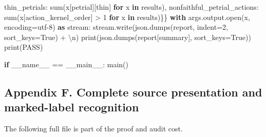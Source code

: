 \documentclass[
  10pt,
  letterpaper,
]{article}
\newenvironment{Shaded}{}{}
\newcommand{\BuiltInTok}[1]{\textcolor[rgb]{0.00,0.50,0.00}{#1}}
\newcommand{\CharTok}[1]{\textcolor[rgb]{0.25,0.44,0.63}{#1}}
\newcommand{\ControlFlowTok}[1]{\textcolor[rgb]{0.00,0.44,0.13}{\textbf{#1}}}
\newcommand{\DecValTok}[1]{\textcolor[rgb]{0.25,0.63,0.44}{#1}}
\newcommand{\ImportTok}[1]{\textcolor[rgb]{0.00,0.50,0.00}{\textbf{#1}}}
\newcommand{\KeywordTok}[1]{\textcolor[rgb]{0.00,0.44,0.13}{\textbf{#1}}}
\newcommand{\NormalTok}[1]{#1}
\newcommand{\OperatorTok}[1]{\textcolor[rgb]{0.40,0.40,0.40}{#1}}
\newcommand{\StringTok}[1]{\textcolor[rgb]{0.25,0.44,0.63}{#1}}
\newcommand{\VariableTok}[1]{\textcolor[rgb]{0.10,0.09,0.49}{#1}}
\begin{document}
\begin{Shaded}
\begin{Highlighting}[]
                 \StringTok{\textquotesingle{}thin\_petrials\textquotesingle{}}\NormalTok{: }\BuiltInTok{sum}\NormalTok{(x[}\StringTok{\textquotesingle{}petrial\textquotesingle{}}\NormalTok{][}\StringTok{\textquotesingle{}thin\textquotesingle{}}\NormalTok{] }\ControlFlowTok{for}\NormalTok{ x }\KeywordTok{in}\NormalTok{ results),}
                 \StringTok{\textquotesingle{}nonfaithful\_petrial\_actions\textquotesingle{}}\NormalTok{: }\BuiltInTok{sum}\NormalTok{(x[}\StringTok{\textquotesingle{}action\_kernel\_order\textquotesingle{}}\NormalTok{] }\OperatorTok{\textgreater{}} \DecValTok{1} \ControlFlowTok{for}\NormalTok{ x }\KeywordTok{in}\NormalTok{ results)\}\}}
    \ControlFlowTok{with}\NormalTok{ args.output.}\BuiltInTok{open}\NormalTok{(}\StringTok{\textquotesingle{}x\textquotesingle{}}\NormalTok{, encoding}\OperatorTok{=}\StringTok{\textquotesingle{}utf{-}8\textquotesingle{}}\NormalTok{) }\ImportTok{as}\NormalTok{ stream:}
\NormalTok{        stream.write(json.dumps(report, indent}\OperatorTok{=}\DecValTok{2}\NormalTok{, sort\_keys}\OperatorTok{=}\VariableTok{True}\NormalTok{) }\OperatorTok{+} \StringTok{\textquotesingle{}}\CharTok{\textbackslash{}n}\StringTok{\textquotesingle{}}\NormalTok{)}
    \BuiltInTok{print}\NormalTok{(json.dumps(report[}\StringTok{\textquotesingle{}summary\textquotesingle{}}\NormalTok{], sort\_keys}\OperatorTok{=}\VariableTok{True}\NormalTok{))}
    \BuiltInTok{print}\NormalTok{(}\StringTok{\textquotesingle{}PASS\textquotesingle{}}\NormalTok{)}


\ControlFlowTok{if} \VariableTok{\_\_name\_\_} \OperatorTok{==} \StringTok{\textquotesingle{}\_\_main\_\_\textquotesingle{}}\NormalTok{:}
\NormalTok{    main()}
\end{Highlighting}
\end{Shaded}

\subsection{Appendix F. Complete source presentation and marked-label
recognition}\label{appendix-f.-complete-source-presentation-and-marked-label-recognition}

The following full file is part of the proof and audit cost.
\end{document}
